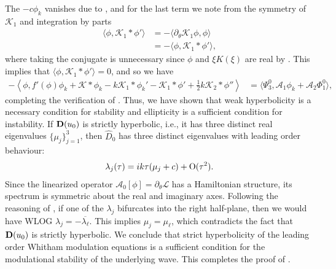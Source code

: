 \documentclass[11pt,leqno]{article}
\numberwithin{equation}{section}
\theoremstyle{definition}
\begin{document}
The $ -c\phi_{k} $ vanishes due to , and for the last term we note from the symmetry of $ \mathcal{K}_{1} $ and integration by parts
\begin{align*}
	\langle\phi,\mathcal{K}_{1}*\phi'\rangle &= -\langle\partial_{\theta}\mathcal{K}_{1}\phi,\phi\rangle\\
	&= -\langle\phi,\mathcal{K}_{1}*\phi'\rangle,
\end{align*}
where taking the conjugate is unnecessary since $ \phi $ and $ \xi K(\xi) $ are real by . This implies that $ \langle\phi,\mathcal{K}_{1}*\phi'\rangle = 0 $, and so we have
\begin{align*}
	-\left\langle \phi,f'(\phi)\phi_{k} + \mathcal{K}*\phi_{k} - k\mathcal{K}_{1}*\phi_{k}' - \mathcal{K}_{1}*\phi' + \frac{1}{2}k\mathcal{K}_{2}*\phi'' \right\rangle &= \langle\Psi_{3}^{0},\mathcal{A}_{1}\phi_{k} + \mathcal{A}_{2}\Phi_{1}^{0} \rangle,
\end{align*}
completing the verification of . Thus, we have shown that weak hyperbolicity is a necessary condition for stability and ellipticity is a sufficient condition for instability. If $ {\bf D}(u_{0}) $ is strictly hyperbolic, i.e., it has three distinct real eigenvalues $ \{\mu_{j}\}_{j = 1}^{3} $, then $ \widehat{D}_{0} $ has three distinct eigenvalues with leading order behaviour:
\begin{align*}
	\lambda_{j}(\tau) = ik\tau(\mu_{j} + c) + \rm O(\tau^2).
\end{align*}
Since the linearized operator $ \mathcal{A}_{0}[\phi] = \partial_{\theta}\mathcal{L} $ has a Hamiltonian structure, its spectrum is symmetric about the real and imaginary axes. Following the reasoning of \cite{JZ2010}, if one of the $ \lambda_{j} $ bifurcates into the right half-plane, then we would have WLOG $ \lambda_{j} = -\overline{\lambda_{\ell}} $. This implies $ \mu_{j} = \mu_{\ell} $, which contradicts the fact that $ {\bf D}(u_{0}) $ is strictly hyperbolic. We conclude that strict hyperbolicity of the leading order Whitham modulation equations is a sufficient condition for the modulational stability of the underlying wave. This completes the proof of . 
\end{document}
